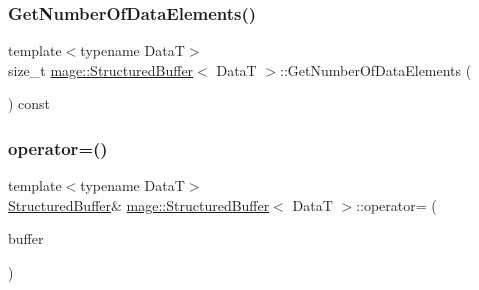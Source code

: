 \hypertarget{structmage_1_1_structured_buffer_ac37240379dcec90139ce727a915169fc}{}\label{structmage_1_1_structured_buffer_ac37240379dcec90139ce727a915169fc} 
\subsubsection{\texorpdfstring{Get\+Number\+Of\+Data\+Elements()}{GetNumberOfDataElements()}}
{\footnotesize\ttfamily template$<$typename DataT$>$ \\
size\+\_\+t \hyperlink{structmage_1_1_structured_buffer}{mage\+::\+Structured\+Buffer}$<$ DataT $>$\+::Get\+Number\+Of\+Data\+Elements (\begin{DoxyParamCaption}{ }\end{DoxyParamCaption}) const}

\hypertarget{structmage_1_1_structured_buffer_ac00255155ab1eb61244392adcf262d40}{}\label{structmage_1_1_structured_buffer_ac00255155ab1eb61244392adcf262d40} 
\subsubsection{\texorpdfstring{operator=()}{operator=()}\hspace{0.1cm}{\footnotesize\ttfamily [1/2]}}
{\footnotesize\ttfamily template$<$typename DataT$>$ \\
\hyperlink{structmage_1_1_structured_buffer}{Structured\+Buffer}\& \hyperlink{structmage_1_1_structured_buffer}{mage\+::\+Structured\+Buffer}$<$ DataT $>$\+::operator= (\begin{DoxyParamCaption}\item[{const \hyperlink{structmage_1_1_structured_buffer}{Structured\+Buffer}$<$ DataT $>$ \&}]{buffer }\end{DoxyParamCaption})\hspace{0.3cm}{\ttfamily [delete]}}

\hypertarget{structmage_1_1_structured_buffer_a2647510e153d15b89f860e2a5c68e231}{}\label{structmage_1_1_structured_buffer_a2647510e153d15b89f860e2a5c68e231} 
